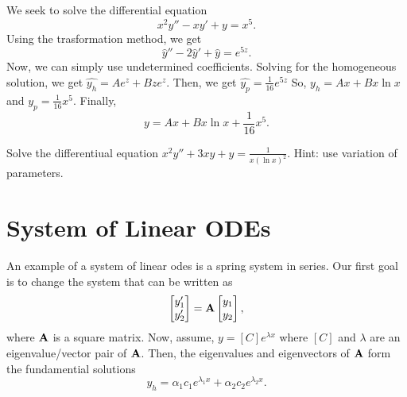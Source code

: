 \begin{example}
    We seek to solve the differential equation $$x^2y''-xy'+y=x^5.$$
    Using the trasformation method, we get $$\hat{y}''-2\hat{y}'+\hat{y}=e^{5z}.$$
    Now, we can simply use undetermined coefficients. Solving for the
    homogeneous solution, we get $\hat{y_h} = Ae^z+Bze^z$. Then, we
    get $\hat{y_p} = \frac{1}{16}e^{5z}$ So, $y_h = Ax+Bx\ln x$ and
    $y_p = \frac{1}{16}x^5$. Finally, $$y = Ax+Bx\ln x + \frac{1}{16}x^5.$$
\end{example}
\begin{exercise}
    Solve the differentiual equation  $x^2y''+3xy+y = \frac{1}{x\left(\ln x \right)^2}$.
    Hint: use variation of parameters.
\end{exercise}

\section{System of Linear ODEs}
An example of a system of linear odes is a spring system in series. Our first
goal is to change the system that can be written as
$$\begin{bmatrix} y_1' \\ y_2'\end{bmatrix} = \bold{A}\begin{bmatrix} y_1 \\y_2 \end{bmatrix},$$
where $\bold{A}$ is a square matrix. Now, assume, $y = [C]e^{\lambda x}$
where $[C]$ and $\lambda$ are an eigenvalue/vector pair of $\bold{A}$.  Then,
the eigenvalues and eigenvectors of $\bold{A}$ form the fundamential solutions
$$y_h = \alpha_1 c_1e^{\lambda_1 x} + \alpha_2 c_2e^{\lambda_2 x}.$$
